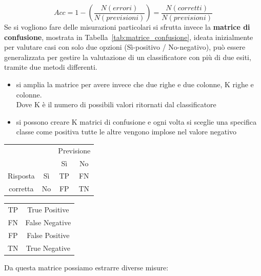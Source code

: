 %
\begin{equation}
	Acc = 1 - \left( \frac{N(errori)}{N(previsioni)} \right) = \frac{N(corretti)}{N(previsioni)}
	\label{eq:accuratezza}
\end{equation}
%
Se si vogliono fare delle misurazioni particolari si sfrutta invece la \textbf{matrice di confusione}, mostrata in Tabella~\ref{tab:matrice_confusione}, ideata inizialmente per valutare casi con solo due opzioni (Sì-positivo / No-negativo), può essere generalizzata per gestire la valutazione di un classificatore con più di due esiti, tramite due metodi differenti.
\begin{itemize}
	\item si amplia la matrice per avere invece che due righe e due colonne, K righe e colonne.\\
	Dove K è il numero di possibili valori ritornati dal classificatore
	\item si possono creare K matrici di confusione e ogni volta si sceglie una specifica classe come positiva tutte le altre vengono implose nel valore negativo
\end{itemize}
%
\begin{multicols}{2}
\begin{center}
	\begin{tabular}{cc|c|c|}
		 &  & \multicolumn{2}{|c|}{Previsione}\\
		 &  & Sì & No\\
		 \hline
		 Risposta & Sì & TP & FN\\
		 \hline
		 corretta & No & FP & TN\\
		\hline
	\end{tabular}
	\label{tab:matrice_confusione}
	\begin{tabular}{|c|c|}
		\hline
		TP & True Positive \\
		FN & False Negative \\
		FP & False Positive \\
		TN & True Negative \\
		\hline
	\end{tabular}
	\label{tab:MC_significato}
\end{center}
\end{multicols}
%
Da questa matrice possiamo estrarre diverse misure:
